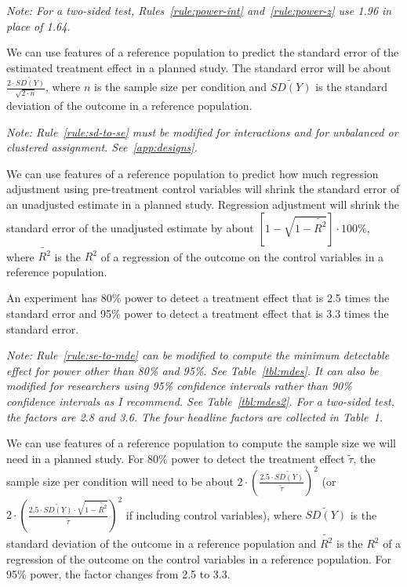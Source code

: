 \documentclass[12pt]{article}
\begin{document}
{\noindent \footnotesize\textit{Note: For a two-sided test, Rules~\ref{rule:power-int} and~\ref{rule:power-z} use 1.96 in place of 1.64.}}

\begin{rule0}[SD to SE]
\label{rule:sd-to-se}
We can use features of a reference population to predict the standard error of the estimated treatment effect in a planned study. The standard error will be about $\frac{2 \cdot \widetilde{SD(Y)}}{\sqrt{2 \cdot n}}$, where $n$ is the sample size per condition and $\widetilde{SD(Y)}$ is the standard deviation of the outcome in a reference population.
\end{rule0}

{\noindent \footnotesize\textit{Note: Rule~\ref{rule:sd-to-se} must be modified for interactions and for unbalanced or clustered assignment. See~\ref{app:designs}.}}

\begin{rule0}[Adjustment]
\label{rule:adjustment}
We can use features of a reference population to predict how much regression adjustment using pre-treatment control variables will shrink the standard error of an unadjusted estimate in a planned study. Regression adjustment will shrink the standard error of the unadjusted estimate by about $\left\lbrack 1 - \sqrt{1 - \widetilde{R^{2}}} \right\rbrack \cdot 100\%$, where $\widetilde{R^2}$ is the $R^2$ of a regression of the outcome on the control variables in a reference population.
\end{rule0}

\begin{rule0}
\label{rule:se-to-mde}
An experiment has 80\% power to detect a treatment effect that is 2.5 times the standard error and 95\% power to detect a treatment effect that is 3.3 times the standard error.
\end{rule0}

{\noindent \footnotesize \textit{Note: Rule~\ref{rule:se-to-mde} can be modified to compute the minimum detectable effect for power other than 80\% and 95\%. See Table~\ref{tbl:mdes}. It can also be modified for researchers using 95\% confidence intervals rather than 90\% confidence intervals as I recommend. See Table~\ref{tbl:mdes2}. For a two-sided test, the factors are 2.8 and 3.6. The four headline factors are collected in Table~1.}}

\begin{rule0}
\label{rule:sd-to-sample-size}
We can use features of a reference population to compute the sample size we will need in a planned study.
For 80\% power to detect the treatment effect $\widetilde{\tau}$, the sample size per condition will need to be about $2 \cdot \left( \frac{2.5 \cdot \widetilde{SD(Y)}}{\widetilde{\tau}} \right)^{2}$ (or $2 \cdot \left( \frac{2.5 \cdot \widetilde{SD(Y)} \cdot \sqrt{1 - \widetilde{R^{2}}}}{\widetilde{\tau}} \right)^{2}$ if including control variables), where $\widetilde{SD(Y)}$ is the standard deviation of the outcome in a reference population and $\widetilde{R^2}$ is the $R^2$ of a regression of the outcome on the control variables in a reference population.
For 95\% power, the factor changes from 2.5 to 3.3.
\end{rule0}
\end{document}
